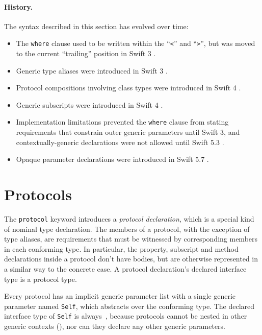 \documentclass[../generics]{subfiles}
\begin{document}
\paragraph{History.} The syntax described in this section has evolved over time:
\begin{itemize}
\item The \texttt{where} clause used to be written within the ``\texttt{<}'' and ``\texttt{>}'', but was moved to the current ``trailing'' position in Swift 3 \cite{se0081}.
\item Generic type aliases were introduced in Swift 3 \cite{se0048}.
\item Protocol compositions involving class types were introduced in Swift 4 \cite{se0156}.
\item Generic subscripts were introduced in Swift 4 \cite{se0148}.
\item Implementation limitations prevented the \texttt{where} clause from stating requirements that constrain outer generic parameters until Swift 3, and contextually-generic declarations were not allowed until Swift 5.3 \cite{se0261}.
\item Opaque parameter declarations were introduced in Swift 5.7 \cite{se0341}.
\end{itemize}

\section{Protocols}\label{protocols}

The \texttt{protocol} keyword introduces a \emph{protocol declaration}, which is a special kind of nominal type declaration. The members of a protocol, with the exception of type aliases, are requirements that must be witnessed by corresponding members in each conforming type. In particular, the property, subscript and method declarations inside a protocol don't have bodies, but are otherwise represented in a similar way to the concrete case. A protocol declaration's declared interface type is a protocol type.

Every protocol has an implicit generic parameter list with a single generic parameter named \texttt{Self}, which abstracts over the conforming type. The declared interface type of \texttt{Self} is always~\rT, because protocols cannot be nested in other generic contexts (), nor can they declare any other generic parameters.
\end{document}
